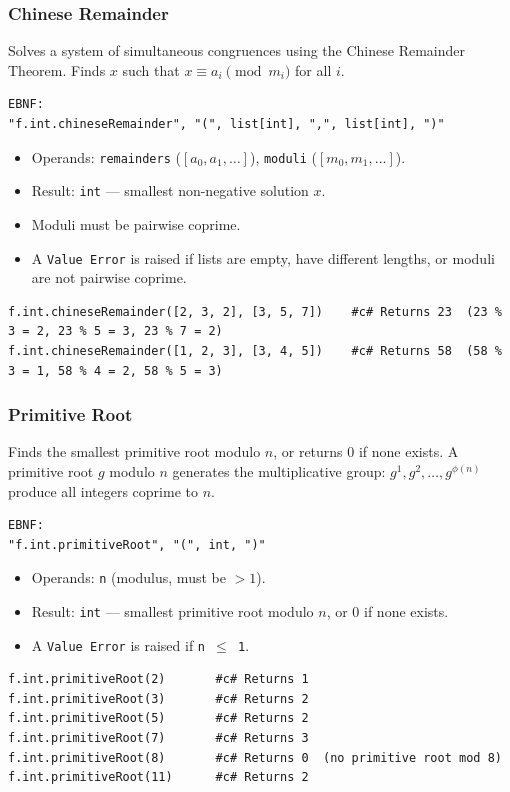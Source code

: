 \subsubsection{Chinese Remainder}
Solves a system of simultaneous congruences using the Chinese Remainder Theorem. Finds $x$ such that $x \equiv a_i \pmod{m_i}$ for all $i$.
\begin{verbatim}
EBNF:
"f.int.chineseRemainder", "(", list[int], ",", list[int], ")"
\end{verbatim}
\begin{itemize}
\item Operands: \texttt{remainders} ($[a_0, a_1, \ldots]$), \texttt{moduli} ($[m_0, m_1, \ldots]$).
\item Result: \texttt{int} --- smallest non-negative solution $x$.
\item Moduli must be pairwise coprime.
\item A \texttt{Value Error} is raised if lists are empty, have different lengths, or moduli are not pairwise coprime.
\end{itemize}
\begin{verbatim}
f.int.chineseRemainder([2, 3, 2], [3, 5, 7])    #c# Returns 23  (23 % 3 = 2, 23 % 5 = 3, 23 % 7 = 2)
f.int.chineseRemainder([1, 2, 3], [3, 4, 5])    #c# Returns 58  (58 % 3 = 1, 58 % 4 = 2, 58 % 5 = 3)
\end{verbatim}

\subsubsection{Primitive Root}
Finds the smallest primitive root modulo $n$, or returns 0 if none exists. A primitive root $g$ modulo $n$ generates the multiplicative group: $g^1, g^2, \ldots, g^{\phi(n)}$ produce all integers coprime to $n$.
\begin{verbatim}
EBNF:
"f.int.primitiveRoot", "(", int, ")"
\end{verbatim}
\begin{itemize}
\item Operands: \texttt{n} (modulus, must be $> 1$).
\item Result: \texttt{int} --- smallest primitive root modulo $n$, or 0 if none exists.
\item A \texttt{Value Error} is raised if \texttt{n $\leq$ 1}.
\end{itemize}
\begin{verbatim}
f.int.primitiveRoot(2)       #c# Returns 1
f.int.primitiveRoot(3)       #c# Returns 2
f.int.primitiveRoot(5)       #c# Returns 2
f.int.primitiveRoot(7)       #c# Returns 3
f.int.primitiveRoot(8)       #c# Returns 0  (no primitive root mod 8)
f.int.primitiveRoot(11)      #c# Returns 2
\end{verbatim}

